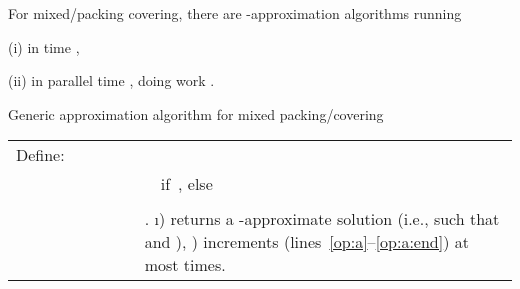 

\begin{theorem}\label{thm:pc}
  For mixed/packing covering, there are -approximation algorithms
  running
  
  \noindent 
  (i) in time ,

  \noindent 
  (ii) in parallel time ,
  doing work .
\end{theorem}











\begin{algorithm}[t]
  \caption{Generic approximation algorithm for mixed packing/covering \LPs\label{alg:pc}}
  \begin{algorithmic}[1]
    \State\label{pc:defn}
    {\renewcommand{\arraystretch}{1.3}
      \begin{tabular}[t]{@{}lr@{\,~}l@{~~~~~}l@{~\,}r@{\,~}l}
        Define:&  & \\
        &  & 
        &  & & ~~if~, else \\ 
        &  &  
        &  & & \\
        &  & 
        &  & & .
        \i) returns a -approximate solution
  (i.e.,  such that  and ),
  \iii) increments  (lines~\ref{op:a}--\ref{op:a:end}) at most  times.
\end{lemma}
See the appendix for a proof,
which follows the proofs of Lemmas 1--5 of~\cite{Young01Sequential}. 
After initialization, Alg.~\ref{alg:pc} simply 
repeats one of two operations: {\bf (a)}
incrementing the current solution  by some vector ,
or {\bf (b)} scaling  by .
In each iteration, it can do either operation whose precondition is met,
and when incrementing  there are many valid ways to choose .

\subsection{Proof of part (i), sequential algorithm}
Alg.~\ref{alg:pc:imp}, which we use to prove part (i) of Thm.~\ref{thm:pc},
repeats these two operations in a particular way.
To reduce the run time to nearly linear,
instead of computing , ,  and  exactly as it proceeds,
Alg.~\ref{alg:pc:imp} maintains estimates:
, , , and .
To prove correctness,
we show that the estimates suffice to ensure
a correct implementation of Alg.~\ref{alg:pc},
which is correct by Lemma~\ref{lemma:pc} (i).


\end{tabular}}
\end{algorithmic}
\end{algorithm}
